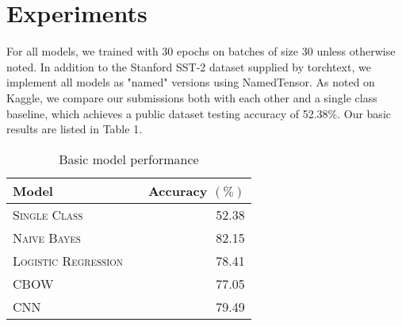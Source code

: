 \documentclass[11pt]{article}
\begin{document}




\section{Experiments}

For all models, we trained with $30$ epochs on batches of size $30$ unless otherwise noted. In addition to the Stanford SST-2 dataset supplied by torchtext, we implement all models as "named" versions using NamedTensor. As noted on Kaggle, we compare our submissions both with each other and a single class baseline, which achieves a public dataset testing accuracy of 52.38\%. Our basic results  are listed in Table 1.

\begin{table}[h]
\centering
\begin{tabular}{llr}
 \toprule
 Model &  & Accuracy $(\%)$ \\
 \midrule
 \textsc{Single Class} & & 52.38\\
 \textsc{Naive Bayes} & & 82.15 \\
 \textsc{Logistic Regression} & & 78.41  \\
 \textsc{CBOW} & &77.05 \\
 \textsc{CNN} & & 79.49\\
 \bottomrule
\end{tabular}
\caption{\label{tab:results} Basic model performance}
\end{table}
\end{document}
